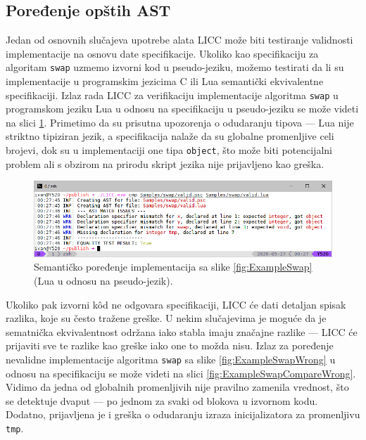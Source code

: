 \subsection{Poređenje opštih AST}
\label{subsec:ImplementationExampleComparer}

Jedan od osnovnih slučajeva upotrebe alata LICC može biti testiranje validnosti implementacije na osnovu date specifikacije. Ukoliko kao specifikaciju za algoritam \texttt{swap} uzmemo izvorni kod u pseudo-jeziku, možemo testirati da li su implementacije u programskim jezicima C ili Lua semantički ekvivalentne specifikaciji. Izlaz rada LICC za verifikaciju implementacije algoritma \texttt{swap} u programskom jeziku Lua u odnosu na specifikaciju u pseudo-jeziku se može videti na slici \ref{fig:ExampleSwapCompareValid}. Primetimo da su prisutna upozorenja o odudaranju tipova --- Lua nije striktno tipiziran jezik, a specifikacija nalaže da su globalne promenljive celi brojevi, dok su u implementaciji one tipa \texttt{object}, što može biti potencijalni problem ali s obzirom na prirodu skript jezika nije prijavljeno kao greška.

\begin{figure}[h!]
\centering
\includegraphics[scale=0.65]{images/eval/cmp_valid.png}
\caption{Semantičko poređenje implementacija sa slike \ref{fig:ExampleSwap} (Lua u odnosu na pseudo-jezik).}
\label{fig:ExampleSwapCompareValid}
\end{figure}

Ukoliko pak izvorni k\^od ne odgovara specifikaciji, LICC će dati detaljan spisak razlika, koje su često tražene greške. U nekim slučajevima je moguće da je sematnička ekvivalentnost održana iako stabla imaju značajne razlike --- LICC će prijaviti sve te razlike kao greške iako one to možda nisu. Izlaz za poređenje nevalidne implementacije algoritma \texttt{swap} sa slike \ref{fig:ExampleSwapWrong} u odnosu na specifikaciju se može videti na slici \ref{fig:ExampleSwapCompareWrong}. Vidimo da jedna od globalnih promenljivih nije pravilno zamenila vrednost, što se detektuje dvaput --- po jednom za svaki od blokova u izvornom kodu. Dodatno, prijavljena je i greška o odudaranju izraza inicijalizatora za promenljivu \texttt{tmp}.

